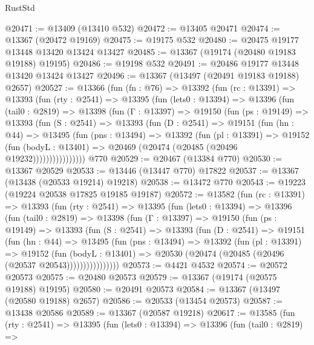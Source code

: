 \begin{lexlean}{RustStd}
\begin{coremodule}
@20471 := @13409 (@13410 @532)
@20472 := @13405 @20471
@20474 := @13367 (@20472 @19169)
@20475 := @19175 @532
@20480 := @20475 @19177 @13448 @13420 @13424 @13427
@20485 := @13367 (@19174 (@20480 @19183 @19188) @19195)
@20486 := @19198 @532
@20491 := @20486 @19177 @13448 @13420 @13424 @13427
@20496 := @13367 (@13497 (@20491 @19183 @19188) @2657)
@20527 := @13366
    (fun (fn : @76) =>
    @13392
      (fun (rc : @13391) =>
      @13393
        (fun (rty : @2541) =>
        @13395
          (fun (lets0 : @13394) =>
          @13396
            (fun (tail0 : @2819) =>
            @13398
              (fun (Γ : @13397) =>
              @19150
                (fun (ps : @19149) =>
                @13393
                  (fun (S : @2541) =>
                  @13393
                    (fun (D : @2541) =>
                    @19151
                      (fun (hn : @44) =>
                      @13495
                        (fun (pns : @13494) =>
                        @13392
                          (fun (pl : @13391) =>
                          @19152
                            (fun (bodyL : @13401) =>
                            @20469 (@20474 (@20485 (@20496 @19232))))))))))))))))
    @770
@20529 := @20467 (@13384 @770)
@20530 := @13367 @20529
@20533 := @13446 (@13447 @770) @17822
@20537 := @13367 (@13438 (@20533 @19214) @19218)
@20538 := @13472 @770
@20543 := @19223 (@19224 @20538 @17825 @19185 @19187)
@20572 := @13582
    (fun (rc : @13391) =>
    @13393
      (fun (rty : @2541) =>
      @13395
        (fun (lets0 : @13394) =>
        @13396
          (fun (tail0 : @2819) =>
          @13398
            (fun (Γ : @13397) =>
            @19150
              (fun (ps : @19149) =>
              @13393
                (fun (S : @2541) =>
                @13393
                  (fun (D : @2541) =>
                  @19151
                    (fun (hn : @44) =>
                    @13495
                      (fun (pns : @13494) =>
                      @13392
                        (fun (pl : @13391) =>
                        @19152
                          (fun (bodyL : @13401) =>
                          @20530 (@20474 (@20485 (@20496 (@20537 @20543))))))))))))))))
@20573 := @4421 @4532
@20574 := @20572 @20573
@20575 := @20480 @20573
@20579 := @13367 (@19174 (@20575 @19188) @19195)
@20580 := @20491 @20573
@20584 := @13367 (@13497 (@20580 @19188) @2657)
@20586 := @20533 (@13454 @20573)
@20587 := @13438 @20586
@20589 := @13367 (@20587 @19218)
@20617 := @13585
    (fun (rty : @2541) =>
    @13395
      (fun (lets0 : @13394) =>
      @13396
        (fun (tail0 : @2819) =>

\end{coremodule}
\end{lexlean}
